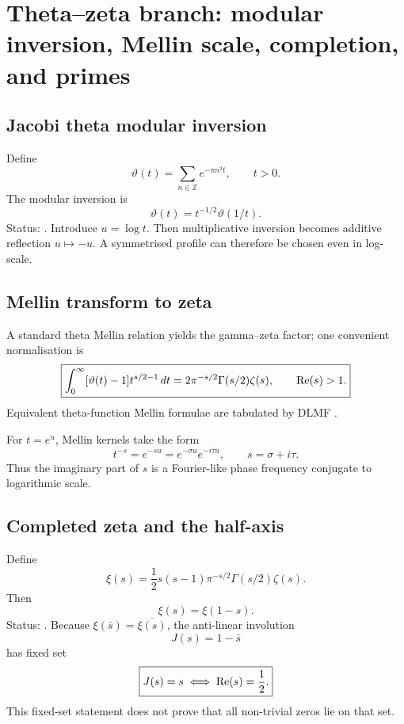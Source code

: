 \section{Theta--zeta branch: modular inversion, Mellin scale, completion, and primes}

\subsection{Jacobi theta modular inversion}

Define
\begin{equation}
\vartheta(t)=\sum_{n\in\mathbb Z}e^{-\pi n^2t},\qquad t>0.
\end{equation}
The modular inversion is
\begin{equation}
\boxed{\vartheta(t)=t^{-1/2}\vartheta(1/t).}
\label{eq:theta-modular}
\end{equation}
Status:  \cite{DLMFTheta}. Introduce \(u=\log t\). Then multiplicative inversion becomes additive reflection \(u\mapsto-u\). A symmetrised profile can therefore be chosen even in log-scale.

\subsection{Mellin transform to zeta}

A standard theta Mellin relation yields the gamma--zeta factor; one convenient normalisation is
\begin{equation}
\boxed{
\int_0^\infty[\vartheta(t)-1]t^{s/2-1}\,dt
=2\pi^{-s/2}\Gamma(s/2)\zeta(s),
\qquad \operatorname{Re}(s)>1.
}
\label{eq:theta-mellin}
\end{equation}
Equivalent theta-function Mellin formulae are tabulated by DLMF \cite{DLMFThetaMellin}.

For \(t=e^u\), Mellin kernels take the form
\begin{equation}
 t^{-s}=e^{-su}=e^{-\sigma u}e^{-i\tau u},
\qquad s=\sigma+i\tau.
\end{equation}
Thus the imaginary part of \(s\) is a Fourier-like phase frequency conjugate to logarithmic scale.

\subsection{Completed zeta and the half-axis}

Define
\begin{equation}
\xi(s)=\frac12s(s-1)\pi^{-s/2}\Gamma(s/2)\zeta(s).
\end{equation}
Then
\begin{equation}
\boxed{\xi(s)=\xi(1-s).}
\label{eq:xi-reflection}
\end{equation}
Status:  \cite{DLMFZetaReflection}. Because \(\xi(\bar s)=\overline{\xi(s)}\), the anti-linear involution
\begin{equation}
J(s)=1-\bar s
\end{equation}
has fixed set
\begin{equation}
\boxed{J(s)=s\iff \operatorname{Re}(s)=\frac12.}
\end{equation}
This fixed-set statement does not prove that all non-trivial zeros lie on that set.

